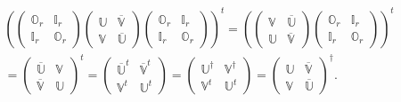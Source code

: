 \documentclass[aps, preprint]{revtex4}
\begin{document}
\begin{align} & \left (\left (\begin{array}{cc}\mathbb{O}_{r} & \mathbb{I}_{r} \\
\mathbb{I}_{r} & \mathbb{O}_{r}\end{array}\right ) \left (\begin{array}{cc}\mathbb{U} & \overline{\mathbb{V}} \\
\mathbb{V} & \overline{\mathbb{U}}\end{array}\right ) \left (\begin{array}{cc}\mathbb{O}_{r} & \mathbb{I}_{r} \\
\mathbb{I}_{r} & \mathbb{O}_{r}\end{array}\right )\right )^{t} =\left (\left (\begin{array}{cc}\mathbb{V} & \overline{\mathbb{U}} \\
\mathbb{U} & \overline{\mathbb{V}}\end{array}\right ) \left (\begin{array}{cc}\mathbb{O}_{r} & \mathbb{I}_{r} \\
\mathbb{I}_{r} & \mathbb{O}_{r}\end{array}\right )\right )^{t} \nonumber  \\
 &  =\left (\begin{array}{cc}\overline{\mathbb{U}} & \mathbb{V} \\
\overline{\mathbb{V}} & \mathbb{U}\end{array}\right )^{t} =\left (\begin{array}{cc}\overline{\mathbb{U}}^{t} & \overline{\mathbb{V}}^{t} \\
\mathbb{V}^{t} & \mathbb{U}^{t}\end{array}\right ) =\left (\begin{array}{cc}\mathbb{U}^{ \dag } & \mathbb{V}^{ \dag } \\
\mathbb{V}^{t} & \mathbb{U}^{t}\end{array}\right ) =\left (\begin{array}{cc}\mathbb{U} & \overline{\mathbb{V}} \\
\mathbb{V} & \overline{\mathbb{U}}\end{array}\right )^{ \dag }\text{.}\end{align}
\end{document}
